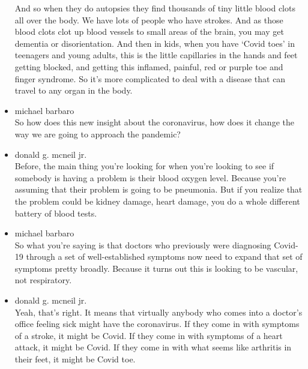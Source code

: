 \begin{itemize}
  And so when they do autopsies they find thousands of tiny little blood
  clots all over the body. We have lots of people who have strokes. And
  as those blood clots clot up blood vessels to small areas of the
  brain, you may get dementia or disorientation. And then in kids, when
  you have `Covid toes' in teenagers and young adults, this is the
  little capillaries in the hands and feet getting blocked, and getting
  this inflamed, painful, red or purple toe and finger syndrome. So it's
  more complicated to deal with a disease that can travel to any organ
  in the body.
\item
  michael barbaro\\
  So how does this new insight about the coronavirus, how does it change
  the way we are going to approach the pandemic?
\item
  donald g. mcneil jr.\\
  Before, the main thing you're looking for when you're looking to see
  if somebody is having a problem is their blood oxygen level. Because
  you're assuming that their problem is going to be pneumonia. But if
  you realize that the problem could be kidney damage, heart damage, you
  do a whole different battery of blood tests.
\item
  michael barbaro\\
  So what you're saying is that doctors who previously were diagnosing
  Covid-19 through a set of well-established symptoms now need to expand
  that set of symptoms pretty broadly. Because it turns out this is
  looking to be vascular, not respiratory.
\item
  donald g. mcneil jr.\\
  Yeah, that's right. It means that virtually anybody who comes into a
  doctor's office feeling sick might have the coronavirus. If they come
  in with symptoms of a stroke, it might be Covid. If they come in with
  symptoms of a heart attack, it might be Covid. If they come in with
  what seems like arthritis in their feet, it might be Covid toe.


\end{itemize}
